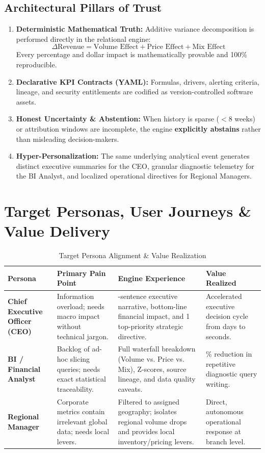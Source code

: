 \documentclass[11pt,a4paper]{article}
\begin{document}
\subsection{Architectural Pillars of Trust}
\begin{enumerate}[leftmargin=*]
    \item \textbf{Deterministic Mathematical Truth:} Additive variance decomposition is performed directly in the relational engine:
    $$\Delta\text{Revenue} = \text{Volume Effect} + \text{Price Effect} + \text{Mix Effect}$$
    Every percentage and dollar impact is mathematically provable and 100\% reproducible.
    \item \textbf{Declarative KPI Contracts (YAML):} Formulas, drivers, alerting criteria, lineage, and security entitlements are codified as version-controlled software assets.
    \item \textbf{Honest Uncertainty \& Abstention:} When history is sparse ($<8$ weeks) or attribution windows are incomplete, the engine \textbf{explicitly abstains} rather than misleading decision-makers.
    \item \textbf{Hyper-Personalization:} The same underlying analytical event generates distinct executive summaries for the CEO, granular diagnostic telemetry for the BI Analyst, and localized operational directives for Regional Managers.
\end{enumerate}

\newpage
\section{Target Personas, User Journeys \& Value Delivery}

\begin{table}[h!]
\centering
\small
\begin{tabularx}{\textwidth}{>{\raggedright\arraybackslash}p{3.5cm} >{\raggedright\arraybackslash}X >{\raggedright\arraybackslash}X >{\raggedright\arraybackslash}X}
\toprule
\textbf{Persona} & \textbf{Primary Pain Point} & \textbf{Engine Experience} & \textbf{Value Realized} \\
\midrule
\textbf{Chief Executive Officer (CEO)} & Information overload; needs macro impact without technical jargon. & 3-sentence executive narrative, bottom-line financial impact, and 1 top-priority strategic directive. & Accelerated executive decision cycle from days to seconds. \\
\midrule
\textbf{BI / Financial Analyst} & Backlog of ad-hoc slicing queries; needs exact statistical traceability. & Full waterfall breakdown (Volume vs. Price vs. Mix), Z-scores, source lineage, and data quality caveats. & 85\% reduction in repetitive diagnostic query writing. \\
\midrule
\textbf{Regional Manager} & Corporate metrics contain irrelevant global data; needs local levers. & Filtered to assigned geography; isolates regional volume drops and provides local inventory/pricing levers. & Direct, autonomous operational response at branch level. \\
\bottomrule
\end{tabularx}
\caption{Target Persona Alignment \& Value Realization}
\end{table}
\end{document}
